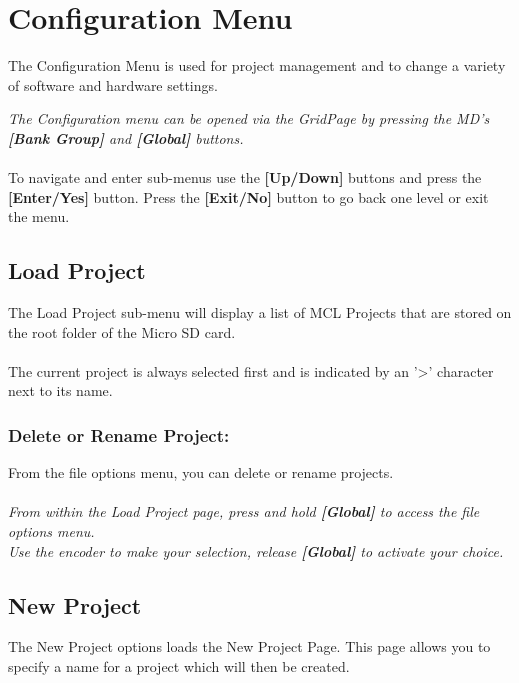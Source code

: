 \chapter{Configuration Menu}
The Configuration Menu is used for project management and to change a variety of software and hardware settings.


\textit{The Configuration menu can be opened via the GridPage by pressing the MD's \textbf{[Bank Group] }and\textbf{ [Global]} buttons.}\\\\
To navigate and enter sub-menus use the \textbf{[Up/Down]} buttons and press the \textbf{[Enter/Yes]} button. Press the \textbf{[Exit/No]} button to go back one level or exit the menu.
\section{Load Project}
The Load Project sub-menu will display a list of MCL Projects that are stored on the root folder of the Micro SD card.\\\\
The current project is always selected first and is indicated by an '>' character next to its name.

\subsection{Delete or Rename Project:}
From the file options menu, you can delete or rename projects.\\\\
\textit{From within the Load Project page, press and hold \textbf{[Global]} to access the file options menu.\\
Use the encoder to make your selection, release \textbf{[Global]} to activate your choice.}

\newpage
\section{New Project}
The New Project options loads the New Project Page. This page allows you to specify a name for a project which will then be created.\\


